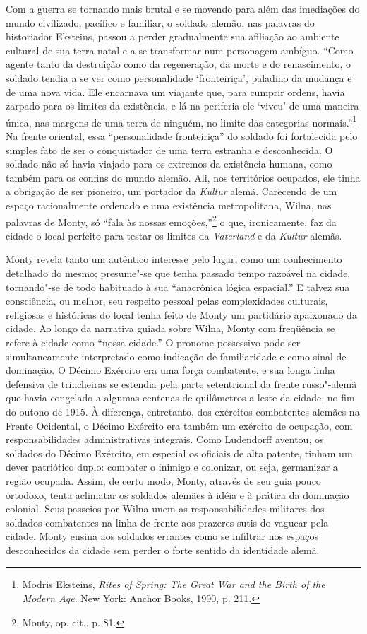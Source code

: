 Com a guerra se tornando mais brutal e se movendo para além das
imediações do mundo civilizado, pacífico e familiar, o soldado alemão,
nas palavras do historiador Eksteins, passou a perder gradualmente sua
afiliação ao ambiente cultural de sua terra natal e a se transformar num
personagem ambíguo. ``Como agente tanto da destruição como da
regeneração, da morte e do renascimento, o soldado tendia a se ver como
personalidade `fronteiriça', paladino da mudança e de uma nova vida. Ele
encarnava um viajante que, para cumprir ordens, havia zarpado para os
limites da existência, e lá na periferia ele `viveu' de uma maneira
única, nas margens de uma terra de ninguém, no limite das categorias
normais.''\footnote{Modris Eksteins, \emph{Rites of Spring: The Great
  War and the Birth of the Modern Age}. New York: Anchor Books, 1990, p.
  211.} Na frente oriental, essa ``personalidade fronteiriça'' do
soldado foi fortalecida pelo simples fato de ser o conquistador de uma
terra estranha e desconhecida. O soldado não só havia viajado para os
extremos da existência humana, como também para os confins do mundo
alemão. Ali, nos territórios ocupados, ele tinha a obrigação de ser
pioneiro, um portador da \emph{Kultur} alemã. Carecendo de um espaço
racionalmente ordenado e uma existência metropolitana, Wilna, nas
palavras de Monty, só ``fala às nossas emoções,''\footnote{Monty, op.
  cit., p. 81.} o que, ironicamente, faz da cidade o local perfeito para
testar os limites da \emph{Vaterland} e da \emph{Kultur} alemãs.

Monty revela tanto um autêntico interesse pelo lugar, como um
conhecimento detalhado do mesmo; presume"-se que tenha passado tempo
razoável na cidade, tornando"-se de todo habituado à sua ``anacrônica
lógica espacial.'' E talvez sua consciência, ou melhor, seu respeito
pessoal pelas complexidades culturais, religiosas e históricas do local
tenha feito de Monty um partidário apaixonado da cidade. Ao longo da
narrativa guiada sobre Wilna, Monty com freqüência se refere à cidade
como ``nossa cidade.'' O pronome possessivo pode ser simultaneamente
interpretado como indicação de familiaridade e como sinal de dominação.
O Décimo Exército era uma força combatente, e sua longa linha defensiva
de trincheiras se estendia pela parte setentrional da frente russo"-alemã
que havia congelado a algumas centenas de quilômetros a leste da cidade,
no fim do outono de 1915. À diferença, entretanto, dos exércitos
combatentes alemães na Frente Ocidental, o Décimo Exército era também um
exército de ocupação, com responsabilidades administrativas integrais.
Como Ludendorff aventou, os soldados do Décimo Exército, em especial os
oficiais de alta patente, tinham um dever patriótico duplo: combater o
inimigo e colonizar, ou seja, germanizar a região ocupada. Assim, de
certo modo, Monty, através de seu guia pouco ortodoxo, tenta aclimatar
os soldados alemães à idéia e à prática da dominação colonial. Seus
passeios por Wilna unem as responsabilidades militares dos soldados
combatentes na linha de frente aos prazeres sutis do vaguear pela
cidade. Monty ensina aos soldados errantes como se infiltrar nos espaços
desconhecidos da cidade sem perder o forte sentido da identidade alemã.

